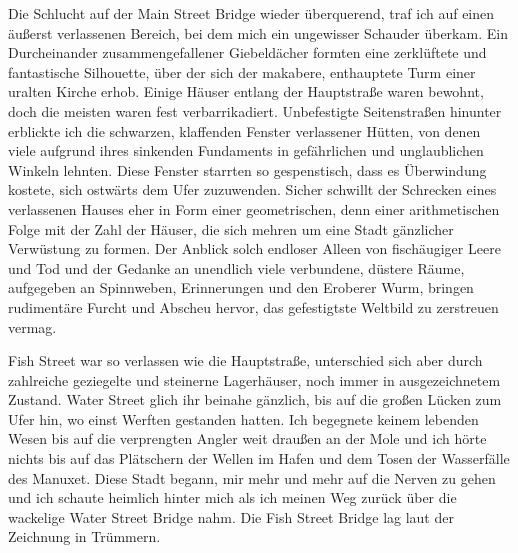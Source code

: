 Die Schlucht auf der Main Street Bridge wieder überquerend, traf ich auf einen äußerst verlassenen Bereich, bei dem mich ein ungewisser Schauder überkam. Ein Durcheinander zusammengefallener Giebeldächer formten eine zerklüftete und fantastische Silhouette, über der sich der makabere, enthauptete Turm einer uralten Kirche erhob.  Einige Häuser entlang der Hauptstraße waren bewohnt, doch die meisten waren fest verbarrikadiert. Unbefestigte Seitenstraßen hinunter erblickte ich die schwarzen, klaffenden Fenster verlassener Hütten, von denen viele aufgrund ihres sinkenden Fundaments in gefährlichen und unglaublichen Winkeln lehnten.
Diese Fenster starrten so gespenstisch, dass es Überwindung kostete, sich ostwärts dem Ufer zuzuwenden. Sicher schwillt der Schrecken eines verlassenen Hauses eher in Form einer geometrischen, denn einer arithmetischen Folge mit der Zahl der Häuser, die sich mehren um eine Stadt gänzlicher Verwüstung zu formen. Der Anblick solch endloser Alleen von fischäugiger Leere und Tod und der Gedanke an unendlich viele verbundene, düstere Räume, aufgegeben an Spinnweben, Erinnerungen und den Eroberer Wurm, bringen rudimentäre Furcht und Abscheu hervor, das gefestigtste Weltbild zu zerstreuen vermag.

Fish Street war so verlassen wie die Hauptstraße, unterschied sich aber durch zahlreiche geziegelte und steinerne Lagerhäuser, noch immer in ausgezeichnetem Zustand. Water Street glich ihr beinahe gänzlich, bis auf die großen Lücken zum Ufer hin, wo einst Werften gestanden hatten. Ich begegnete keinem lebenden Wesen bis auf die verprengten Angler weit draußen an der Mole und ich hörte nichts bis auf das Plätschern der Wellen im Hafen und dem Tosen der Wasserfälle des Manuxet. Diese Stadt begann, mir mehr und mehr auf die Nerven zu gehen und ich schaute heimlich hinter mich als ich meinen Weg zurück über die wackelige Water Street Bridge nahm. Die Fish Street Bridge lag laut der Zeichnung in Trümmern.